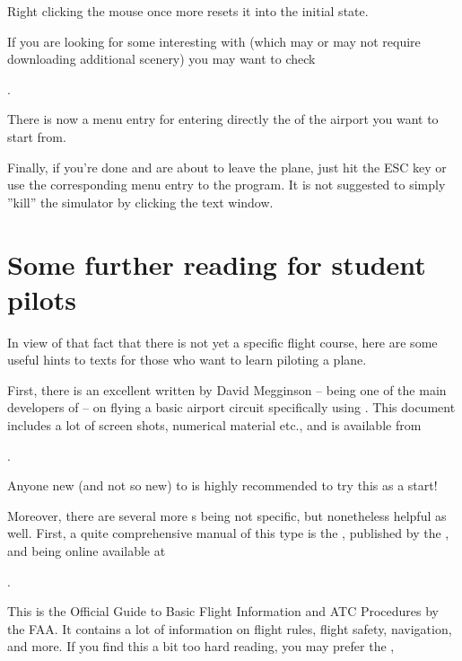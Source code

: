  Right clicking the mouse once more resets it into the initial state.

If you are looking for some interesting  with \FlightGear{}
(which may or may not require downloading additional scenery) you may want to check
 \medskip

 .
  \medskip

\noindent
 There is now a menu entry for entering directly the  of the
airport you want to start from.

Finally, if you're done and are about to leave the plane, just hit the ESC key or use the
corresponding menu entry to  the program. It is not suggested to simply
''kill'' the simulator by clicking the text window.

\section{Some further reading for student pilots\label{flightschoool}}

In view of that fact that there is not yet a \FlightGear{} specific flight course, here
are some useful hints to texts for those who want to learn piloting a plane.

First, there is an excellent  written by David Megginson -- being one of the main developers of \FlightGear{} --  on flying a basic airport circuit specifically using \FlightGear{}. This document includes a lot of screen shots, numerical material etc., and is available from
\medskip

.
\medskip

\noindent
Anyone new (and not so new) to \FlightGear{} is highly recommended to try this as a start!

Moreover, there are several more s being not \FlightGear{} specific, but nonetheless helpful as well. First, a quite comprehensive manual of this type is the , published by the , and being online available at
\medskip

.
\medskip

 \noindent
This is the Official Guide to Basic Flight Information and ATC Procedures by the FAA. It
contains a lot of information on flight rules, flight safety, navigation, and more. If
you find this a bit too hard reading, you may prefer the ,
\medskip

